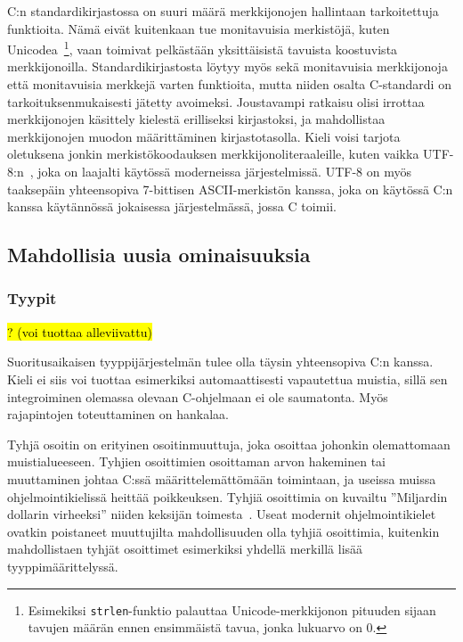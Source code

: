 C:n standardikirjastossa on suuri määrä merkkijonojen hallintaan tarkoitettuja
funktioita. Nämä eivät kuitenkaan tue monitavuisia merkistöjä, kuten Unicodea~\citep{unicode11}\footnote{Esimekiksi
\texttt{strlen}-funktio palauttaa Unicode-merkkijonon pituuden sijaan tavujen
määrän ennen ensimmäistä tavua, jonka lukuarvo on 0.}, vaan toimivat pelkästään
yksittäisistä tavuista koostuvista merkkijonoilla. Standardikirjastosta löytyy
myös sekä monitavuisia merkkijonoja että monitavuisia merkkejä varten
funktioita, mutta niiden osalta C-standardi on tarkoituksenmukaisesti jätetty
avoimeksi. Joustavampi ratkaisu olisi irrottaa merkkijonojen käsittely kielestä
erilliseksi kirjastoksi, ja mahdollistaa merkkijonojen muodon määrittäminen
kirjastotasolla. Kieli voisi tarjota oletuksena jonkin
merkistökoodauksen merkkijonoliteraaleille, kuten vaikka
UTF-8:n~\citep[s. 36]{unicode11}, joka on laajalti käytössä moderneissa
järjestelmissä. UTF-8 on myös taaksepäin yhteensopiva 7-bittisen
ASCII-merkistön kanssa, joka on käytössä C:n kanssa käytännössä jokaisessa
järjestelmässä, jossa C toimii.

\FloatBarrier

\subsection{Mahdollisia uusia ominaisuuksia}

\subsubsection{Tyypit}

\hl{? (voi tuottaa alleviivattu)}

Suoritusaikaisen tyyppijärjestelmän tulee olla täysin yhteensopiva C:n kanssa. Kieli
ei siis voi tuottaa esimerkiksi automaattisesti vapautettua muistia, sillä sen
integroiminen olemassa olevaan C-ohjelmaan ei ole saumatonta. Myös rajapintojen
toteuttaminen on hankalaa.

Tyhjä osoitin on erityinen osoitinmuuttuja, joka osoittaa
johonkin olemattomaan muistialueeseen. Tyhjien osoittimien osoittaman arvon
hakeminen tai muuttaminen johtaa C:ssä määrittelemättömään toimintaan, ja
useissa muissa ohjelmointikielissä heittää poikkeuksen. Tyhjiä osoittimia on
kuvailtu ''Miljardin dollarin virheeksi'' niiden keksijän
toimesta~\citep{billiondollars}. Useat modernit ohjelmointikielet ovatkin
poistaneet muuttujilta mahdollisuuden olla tyhjiä osoittimia, kuitenkin
mahdollistaen tyhjät osoittimet esimerkiksi yhdellä merkillä lisää
tyyppimäärittelyssä.

